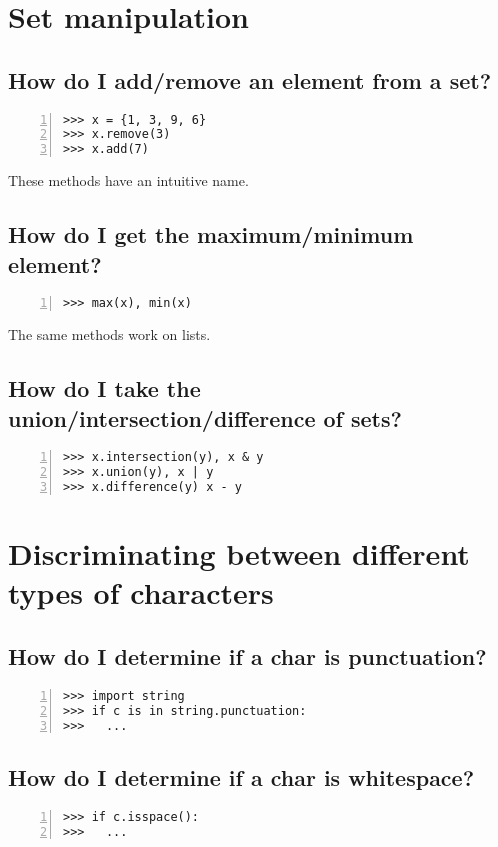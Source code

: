 \documentclass[12pt]{article}
\begin{document}
\section{Set manipulation}
\subsection{How do I add/remove an element from a set?}
\begin{lstlisting}[numbers=left]
>>> x = {1, 3, 9, 6}
>>> x.remove(3)
>>> x.add(7)
\end{lstlisting}
These methods have an intuitive name.

\subsection{How do I get the maximum/minimum element?}
\begin{lstlisting}[numbers=left]
>>> max(x), min(x)
\end{lstlisting}
The same methods work on lists.

\subsection{How do I take the union/intersection/difference of sets?}
\begin{lstlisting}[numbers=left]
>>> x.intersection(y), x & y
>>> x.union(y), x | y
>>> x.difference(y) x - y
\end{lstlisting}

\section{Discriminating between different types of characters}
\subsection{How do I determine if a char is punctuation?}
\begin{lstlisting}[numbers=left]
>>> import string
>>> if c is in string.punctuation:
>>>   ...
\end{lstlisting}

\subsection{How do I determine if a char is whitespace?}
\begin{lstlisting}[numbers=left]
>>> if c.isspace():
>>>   ...
\end{lstlisting}
\end{document}
